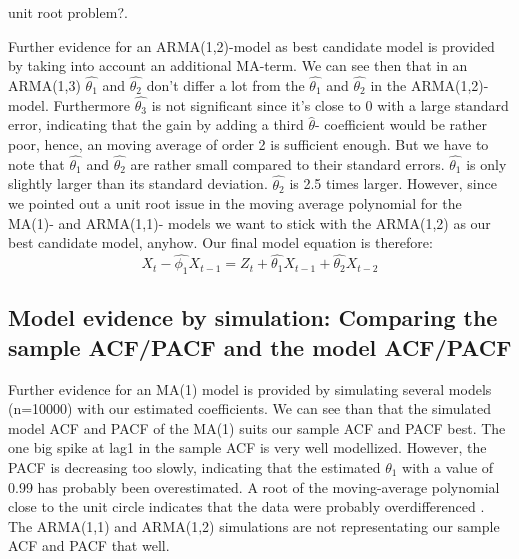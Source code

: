 \documentclass[11pt,a4paper]{article}
\begin{document}
unit root problem?.

Further evidence for an ARMA(1,2)-model as best candidate model is provided by taking into account an additional MA-term. We can see then that in an ARMA(1,3) $\hat{\theta_1}$ and $\hat{\theta_2}$ don't differ a lot from the $\hat{\theta_1}$ and $\hat{\theta_2}$ in the ARMA(1,2)-model. Furthermore $\hat{\theta_3}$ is not significant since it's close to 0 with a large standard error, indicating that the gain by adding a third $\hat{\theta}$- coefficient would be rather poor, hence, an moving average of order 2 is sufficient enough. But we have to note that $\hat{\theta_1}$ and $\hat{\theta_2}$ are rather small compared to their standard errors. $\hat{\theta_1}$ is only slightly larger than its standard deviation. $\hat{\theta_2}$ is 2.5 times larger. However, since we pointed out a unit root issue in the moving average polynomial for the MA(1)- and ARMA(1,1)- models we want to stick with the ARMA(1,2) as our best candidate model, anyhow. Our final model equation is therefore:
\begin{equation}
X_t-\hat{\phi_1}X_{t-1} = Z_t+\hat{\theta_1}X_{t-1}+\hat{\theta_2}X_{t-2}
\end{equation}


\subsection{Model evidence by simulation: Comparing the sample ACF/PACF and the model ACF/PACF}
Further evidence for an MA(1) model is provided by simulating several models (n=10000) with our estimated coefficients. We can see than that the simulated model ACF and PACF of the MA(1) suits our sample ACF and PACF best. The one big spike at lag1 in the sample ACF is very well modellized. However, the PACF is decreasing too slowly, indicating that the estimated $\theta_1$ with a value of 0.99 has probably been overestimated. A root of the moving-average polynomial close to the unit circle indicates that the data were probably overdifferenced \citep[p.~193]{bd02}. The ARMA(1,1) and ARMA(1,2) simulations are not representating our sample ACF and PACF that well.
\end{document}
